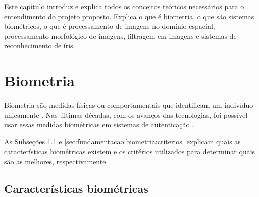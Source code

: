 \newcommand{\texCommand}[1]{\texttt{\textbackslash{#1}}}%

\newcommand{\exemplo}[1]{%
\vspace{\baselineskip}%
\noindent\fbox{\begin{minipage}{\textwidth}#1\end{minipage}}%
\\\vspace{\baselineskip}}%

\newcommand{\exemploVerbatim}[1]{%
\vspace{\baselineskip}%
\noindent\fbox{\begin{minipage}{\textwidth}%
#1\end{minipage}}%
\\\vspace{\baselineskip}}%

\par Este capítulo introduz e explica todos os conceitos teóricos necessários para o entendimento do projeto proposto. Explica o que é biometria, o que são sistemas biométricos, o que é processamento de imagens no domínio espacial, processamento morfológico de imagens, filtragem em imagens e sistemas de reconhecimento de íris.

\section{Biometria} \label{sec:fundamentacao:biometria}

\par Biometria são medidas físicas ou comportamentais que identificam um indivíduo unicamente \cite{li2009encyclopedia}. Nas últimas décadas, com os avanços das tecnologias, foi possível usar essas medidas biométricas em sistemas de autenticação \cite{wayman2005biometric}. 

\par As Subseções \ref{sec:fundamentacao:biometria:caracteristicas} e \ref{sec:fundamentacao:biometria:criterios} explicam quais as características biométricas existem e os critérios utilizados para determinar quais são as melhores, respectivamente. 

\subsection{Características biométricas}\label{sec:fundamentacao:biometria:caracteristicas}

